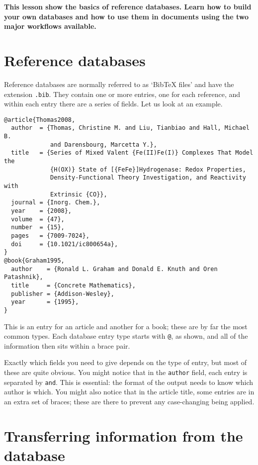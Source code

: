 \documentclass{article}
\begin{document}
{\bfseries This lesson show the basics of reference databases. Learn how to build your own databases and how to use them in documents using the two major workflows available.}

\section{Reference databases}
Reference databases are normally referred to as ‘BibTeX files’ and have the extension \verb|.bib|. They contain one or more entries, one for each reference, and within each entry there are a series of fields. Let us look at an example.
\vspace{0.5cm}

\begin{mdframed}
\begin{verbatim}
@article{Thomas2008,
  author  = {Thomas, Christine M. and Liu, Tianbiao and Hall, Michael B.
             and Darensbourg, Marcetta Y.},
  title   = {Series of Mixed Valent {Fe(II)Fe(I)} Complexes That Model the
             {H(OX)} State of [{FeFe}]Hydrogenase: Redox Properties,
             Density-Functional Theory Investigation, and Reactivity with
             Extrinsic {CO}},
  journal = {Inorg. Chem.},
  year    = {2008},
  volume  = {47},
  number  = {15},
  pages   = {7009-7024},
  doi     = {10.1021/ic800654a},
}
@book{Graham1995,
  author    = {Ronald L. Graham and Donald E. Knuth and Oren Patashnik},
  title     = {Concrete Mathematics},
  publisher = {Addison-Wesley},
  year      = {1995},
}
\end{verbatim}
\end{mdframed}
\vspace{0.5cm}

This is an entry for an article and another for a book; these are by far the most common types. Each database entry type starts with \verb|@|, as shown, and all of the information then sits within a brace pair.

Exactly which fields you need to give depends on the type of entry, but most of these are quite obvious. You might notice that in the \verb|author| field, each entry is separated by \verb|and|. This is essential: the format of the output needs to know which author is which. You might also notice that in the article title, some entries are in an extra set of braces; these are there to prevent any case-changing being applied.

\section{Transferring information from the database}
\end{document}
